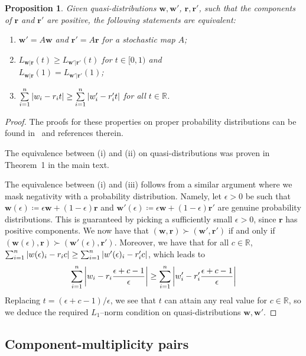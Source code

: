 \documentclass[
twocolumn,
superscriptaddress
]{revtex4-1}
\newtheorem{proposition}[theorem]{Proposition}
\def\r{\boldsymbol{r}}
\def\w{\boldsymbol{w}}
\begin{document}
\begin{proposition}\label{prop:rmajor}
Given quasi-distributions $\w, \w'$, $\r , \r'$, such that the components of $\r$ and $\r'$ are positive, the following statements are equivalent:
  \begin{enumerate}
    \item[(i)] $\w' = A\w$ and $\r' = A\r$ for a stochastic map $A$;
    \item[(ii)] $L_{\w|\r}(t) \geq L_{\w'|\r'}(t)$ for $t\in [0,1)$ and \vspace{5pt}\\ $L_{\w|\r}(1) = L_{\w'|\r'}(1)$;
    \item[(iii)] $\sum\limits_{i=1}^n \abs{w_i - r_i t} \geq \sum\limits_{i=1}^n \abs{w'_i - r'_i t}$ for all $t \in \mathbb{R}$.
  \end{enumerate}
\end{proposition}
\begin{proof}
	The proofs for these properties on proper probability distributions can be found in~\cite{cit:marshall,ruch_mixing_1978,Renes_2016,Buscemi_2017} and references therein.
	
	The equivalence between (i) and (ii) on quasi-distributions was proven in Theorem~1 in the main text.
	
	The equivalence between (i) and (iii) follows from a similar argument where we mask negativity with a probability distribution.
	Namely, let $\epsilon > 0$ be such that $\w(\epsilon) \coloneqq \epsilon \w + (1-\epsilon) \r$ and $\w'(\epsilon) \coloneqq \epsilon \w + (1-\epsilon) \r'$ are genuine probability distributions. This is guaranteed by picking a sufficiently small $\epsilon > 0$, since $\r$ has positive components. We now have that $(\w , \r) \succ (\w', \r')$ if and only if $(\w(\epsilon) , \r) \succ (\w'(\epsilon), \r')$.
	Moreover, we have that for all $c \in \mathbb{R}$, $\sum_{i=1}^n \abs{w(\epsilon)_i - r_i c} \geq \sum_{i=1}^n \abs{w'(\epsilon)_i - r'_i c}$, which leads to
	\begin{align*}
		\sum\limits_{i=1}^n \abs{w_i - r_i \frac{\epsilon + c - 1}{\epsilon}} \geq \sum\limits_{i=1}^n \abs{w'_i - r'_i \frac{\epsilon + c - 1}{\epsilon}}
	\end{align*}
Replacing $t = (\epsilon + c - 1)/\epsilon$, we see that $t$ can attain any real value for $c \in \mathbb{R}$, so we deduce the required $L_1$--norm condition on quasi-distributions $\w, \w'$.
\end{proof}

\subsection*{Component-multiplicity pairs}
\end{document}
